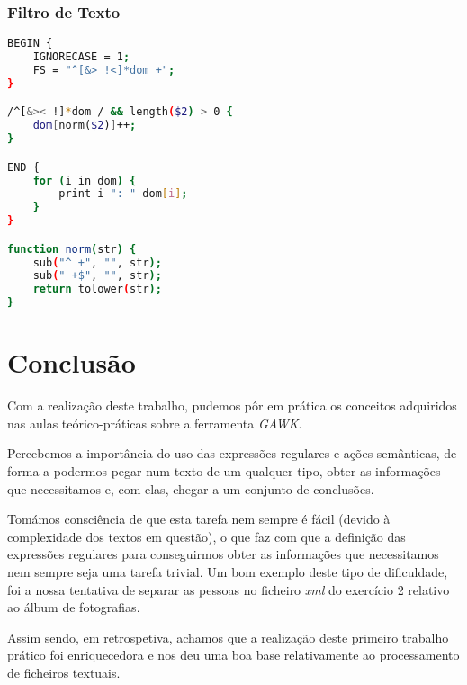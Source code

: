 \documentclass{article}
\begin{document}
\subsubsection{Filtro de Texto}

\begin{lstlisting}[language=bash]
BEGIN {
	IGNORECASE = 1;
	FS = "^[&> !<]*dom +";
}

/^[&>< !]*dom / && length($2) > 0 {
	dom[norm($2)]++;
}

END {
	for (i in dom) {
		print i ": " dom[i];
	}
}

function norm(str) {
	sub("^ +", "", str);
	sub(" +$", "", str);
	return tolower(str);
}

\end{lstlisting}


\vspace{15}
\section{Conclusão}

Com a realização deste trabalho, pudemos pôr em prática os conceitos adquiridos nas aulas teórico-práticas sobre a ferramenta \emph{GAWK}.

Percebemos a importância do uso das expressões regulares e ações semânticas, de forma a podermos pegar num texto de um qualquer tipo, obter as informações que necessitamos e, com elas, chegar a um conjunto de conclusões.

Tomámos consciência de que esta tarefa nem sempre é fácil (devido à complexidade dos textos em questão), o que faz com que a definição das expressões regulares para conseguirmos obter as informações que necessitamos nem sempre seja uma tarefa trivial. Um bom exemplo deste tipo de dificuldade, foi a nossa tentativa de separar as pessoas no ficheiro \emph{xml} do exercício 2 relativo ao álbum de fotografias.

Assim sendo, em retrospetiva, achamos que a realização deste primeiro trabalho prático foi enriquecedora e nos deu uma boa base relativamente ao processamento de ficheiros textuais.
\end{document}
